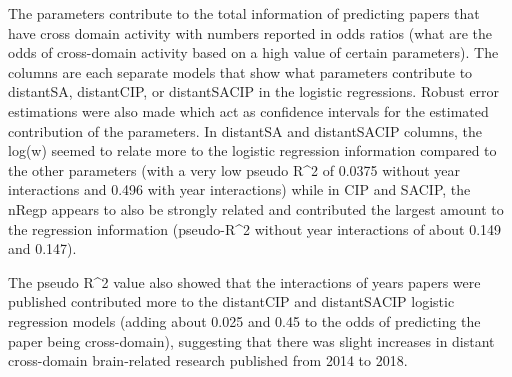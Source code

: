 \documentclass[
]{article}
\begin{document}
The parameters contribute to the total information of predicting papers
that have cross domain activity with numbers reported in odds ratios
(what are the odds of cross-domain activity based on a high value of
certain parameters). The columns are each separate models that show what
parameters contribute to distantSA, distantCIP, or distantSACIP in the
logistic regressions. Robust error estimations were also made which act
as confidence intervals for the estimated contribution of the
parameters. In distantSA and distantSACIP columns, the log(w) seemed to
relate more to the logistic regression information compared to the other
parameters (with a very low pseudo R\^{}2 of 0.0375 without year
interactions and 0.496 with year interactions) while in CIP and SACIP,
the nRegp appears to also be strongly related and contributed the
largest amount to the regression information (pseudo-R\^{}2 without year
interactions of about 0.149 and 0.147).

The pseudo R\^{}2 value also showed that the interactions of years
papers were published contributed more to the distantCIP and
distantSACIP logistic regression models (adding about 0.025 and 0.45 to
the odds of predicting the paper being cross-domain), suggesting that
there was slight increases in distant cross-domain brain-related
research published from 2014 to 2018.
\end{document}

